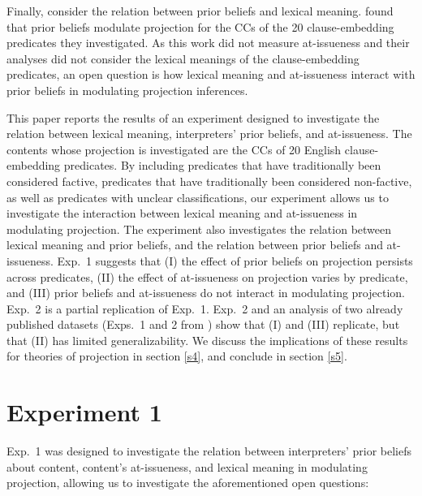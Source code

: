 \documentclass[11pt,fleqn]{article}
\newcommand{\6}{\mbox{$[\hspace*{-.6mm}[$}}
\newcommand{\9}{\mbox{$]\hspace*{-.6mm}]$}}
\begin{document}
Finally, consider the relation between prior beliefs and lexical meaning.  \citealt{degen-tonhauser-openmind} found that prior beliefs modulate projection for the CCs of the 20 clause-embedding predicates they investigated. As this work did not measure at-issueness and their analyses did not consider the lexical meanings of the clause-embedding predicates, an open question is how lexical meaning and at-issueness interact with prior beliefs in modulating projection inferences.

This paper reports the results of an experiment designed to investigate the relation between lexical meaning, interpreters' prior beliefs, and at-issueness. The contents whose projection is investigated are the CCs of 20 English clause-embedding predicates. By including predicates that have traditionally been considered factive, predicates that have traditionally been considered non-factive, as well as predicates with unclear classifications, our experiment allows us to investigate the interaction between lexical meaning and at-issueness in modulating projection. The experiment also investigates the relation between lexical meaning and prior beliefs, and the relation between prior beliefs and at-issueness. Exp.~1 suggests that (I) the effect of prior beliefs on projection persists across predicates, (II) the effect of at-issueness on projection varies by predicate, and (III) prior beliefs and at-issueness do not interact in modulating projection. Exp.~2 is a partial replication of Exp.~1. Exp.~2 and an analysis of two already published datasets (Exps.~1 and 2 from \citealt{degen-tonhauser-openmind}) show that (I) and (III) replicate, but that (II) has limited generalizability. We discuss the implications of these results for theories of projection in section \ref{s4}, and conclude in section \ref{s5}.

\section{Experiment 1}\label{s2}

Exp.~1 was designed to investigate the relation between interpreters' prior beliefs about content, content's at-issueness, and lexical meaning in modulating projection, allowing us to investigate the aforementioned open questions: 
\end{document}
